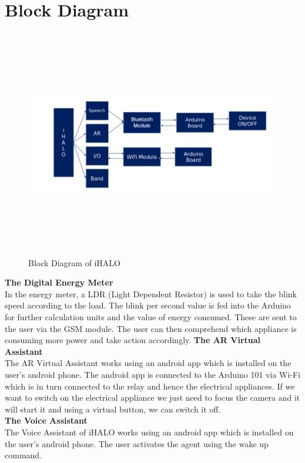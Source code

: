 \section{Block Diagram}
\begin{figure}[H]
	
	\centering
	\includegraphics[width=\linewidth,height=10cm] {./images/p6.png}
	\caption{Block Diagram of iHALO}
	\label{manual}
\end{figure}
\textbf{The Digital Energy Meter}\\
In the energy meter, a LDR (Light Dependent Resistor) is used to take the blink speed according to the load. The blink per second value is fed into the Arduino for further calculation units and the value of energy consumed. These are sent to the user via the GSM module. The user can then comprehend which appliance is consuming more power and take action accordingly.
\textbf{The AR Virtual Assistant}\\
The AR Virtual Assistant works using an android app which is installed on the user’s android phone. The android app is connected to the Arduino 101 via Wi-Fi which is in turn connected to the relay and hence the electrical appliances. If we want to switch on the electrical appliance we just need to focus the camera and it will start it and using a virtual button, we can switch it off.\\
\textbf{The Voice Assistant}\\
The Voice Assistant of iHALO works using an android app which is installed on the user’s android phone. The user activates the agent using the wake up command.\\
